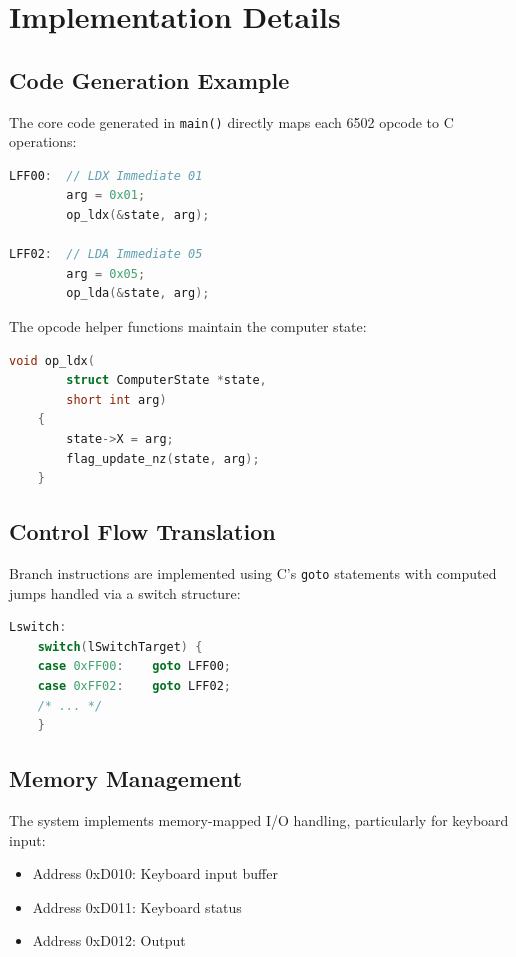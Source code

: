 \documentclass[10pt,twocolumn]{article}
\begin{document}
\section{Implementation Details}
\subsection{Code Generation Example}
The core code generated in \texttt{main()} directly maps each 6502 opcode to C operations:

\begin{lstlisting}[language=C]
LFF00:  // LDX Immediate 01
        arg = 0x01;
        op_ldx(&state, arg);

LFF02:  // LDA Immediate 05
        arg = 0x05;
        op_lda(&state, arg);
\end{lstlisting}

The opcode helper functions maintain the computer state:

\begin{lstlisting}[language=C]
    void op_ldx(
        struct ComputerState *state, 
        short int arg) 
    {
        state->X = arg;
        flag_update_nz(state, arg);
    }
    \end{lstlisting}
    

\subsection{Control Flow Translation}
Branch instructions are implemented using C's \texttt{goto} statements with computed jumps handled via a switch structure:

\begin{lstlisting}[language=C]
Lswitch:
    switch(lSwitchTarget) {
    case 0xFF00:    goto LFF00;
    case 0xFF02:    goto LFF02;
    /* ... */
    }
\end{lstlisting}

\subsection{Memory Management}
The system implements memory-mapped I/O handling, particularly for keyboard input:
\begin{itemize}
    \item Address 0xD010: Keyboard input buffer
    \item Address 0xD011: Keyboard status
    \item Address 0xD012: Output
\end{itemize}
\end{document}

